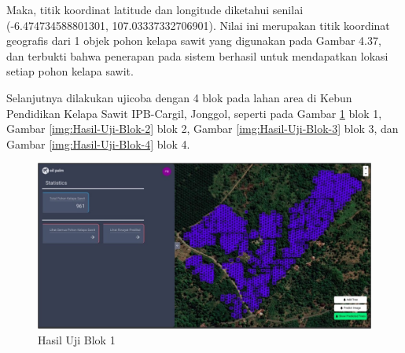 Maka, titik koordinat latitude dan longitude diketahui senilai (-6.474734588801301, 107.03337332706901). Nilai ini merupakan titik koordinat geografis dari 1 objek pohon kelapa sawit yang digunakan pada Gambar 4.37, dan terbukti bahwa penerapan pada sistem berhasil untuk mendapatkan lokasi setiap pohon kelapa sawit.

Selanjutnya dilakukan ujicoba dengan 4 blok pada lahan area di Kebun Pendidikan Kelapa Sawit IPB-Cargil, Jonggol, seperti pada Gambar \ref{img:Hasil-Uji-Blok-1} blok 1, Gambar \ref{img:Hasil-Uji-Blok-2} blok 2, Gambar \ref{img:Hasil-Uji-Blok-3} blok 3, dan Gambar \ref{img:Hasil-Uji-Blok-4} blok 4.

\begin{figure}[H]
	\vspace{-0.1cm}
	\begin{center}
		\includegraphics[width=1\columnwidth]{bab4/Gambar/Picture40.jpg}
	\end{center}
	\vspace{-0.2cm}
	\captionsetup{justification=centering}
	\caption{Hasil Uji Blok 1}\label{img:Hasil-Uji-Blok-1}
\end{figure}

